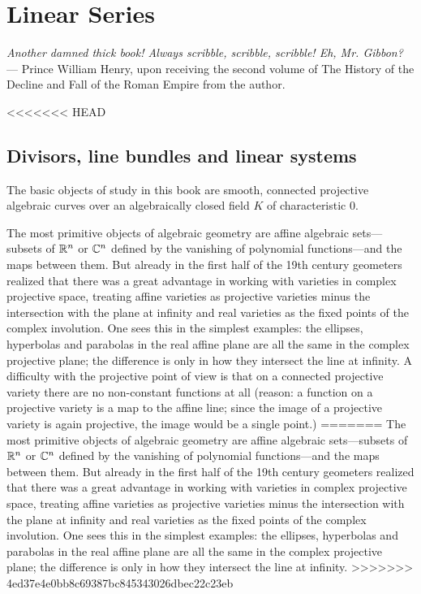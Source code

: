 


\chapter{Linear Series}

\begin{center}
\emph{Another damned thick book! Always scribble, scribble, scribble! Eh, Mr. Gibbon?} --- \scriptsize{Prince William Henry, upon receiving the second  volume of The History of the Decline and Fall of the Roman Empire from the author.}
\end{center}

<<<<<<< HEAD


\section{Divisors, line bundles and linear systems}

The basic objects of study in this book are smooth, connected projective algebraic curves over an algebraically closed field $K$ of characteristic 0. 

The most primitive objects of algebraic geometry are affine algebraic sets---subsets of $\RR^{n}$ or $\CC^{n}$ defined by the vanishing of polynomial functions---and the maps between them. But already in the first half of the 19th century geometers realized that there was a great advantage in working with varieties in complex projective space, treating affine varieties as projective varieties minus the intersection with the plane at infinity and real varieties as the fixed points of the complex involution. One sees this in the simplest examples: the ellipses, hyperbolas and parabolas in the real affine plane are all the same in the complex projective plane; the difference is only in how they intersect the line at infinity. A difficulty with the projective point of view is that on a connected projective variety there are no non-constant functions at all (reason: a function on a projective variety is a map to the affine line; since the image of a projective variety is again projective, the image would be a single point.) 
=======
The most primitive objects of algebraic geometry are affine algebraic sets---subsets of $\RR^{n}$ or $\CC^{n}$ defined by the vanishing of polynomial functions---and the maps between them. But already in the first half of the 19th century geometers realized that there was a great advantage in working with varieties in complex projective space, treating affine varieties as projective varieties minus the intersection with the plane at infinity and real varieties as the fixed points of the complex involution. One sees this in the simplest examples: the ellipses, hyperbolas and parabolas in the real affine plane are all the same in the complex projective plane; the difference is only in how they intersect the line at infinity.
>>>>>>> 4ed37e4e0bb8c69387bc845343026dbec22c23eb

